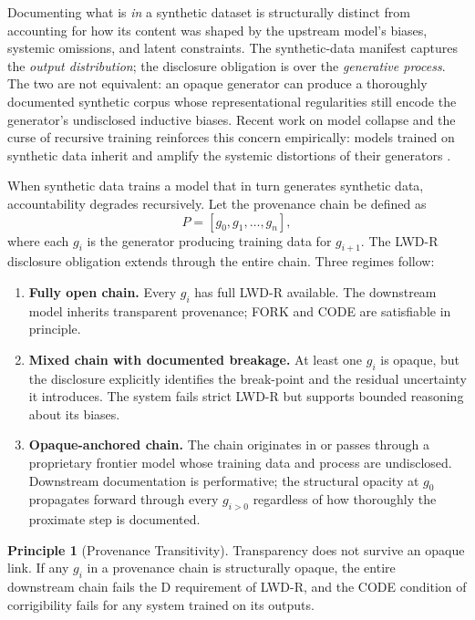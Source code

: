 \documentclass{article}
\theoremstyle{definition}
\newtheorem{principle}{Principle}[section]
\begin{document}
Documenting what is \emph{in} a synthetic dataset is structurally distinct from accounting for how its content was shaped by the upstream model's biases, systemic omissions, and latent constraints. The synthetic-data manifest captures the \emph{output distribution}; the disclosure obligation is over the \emph{generative process}. The two are not equivalent: an opaque generator can produce a thoroughly documented synthetic corpus whose representational regularities still encode the generator's undisclosed inductive biases. Recent work on model collapse and the curse of recursive training reinforces this concern empirically: models trained on synthetic data inherit and amplify the systemic distortions of their generators \citep{shumailov2023curse}.

When synthetic data trains a model that in turn generates synthetic data, accountability degrades recursively. Let the provenance chain be defined as
\[
P = [g_0, g_1, \ldots, g_n],
\]
where each $g_i$ is the generator producing training data for $g_{i+1}$. The LWD-R disclosure obligation extends through the entire chain. Three regimes follow:

\begin{enumerate}[noitemsep]
    \item \textbf{Fully open chain.} Every $g_i$ has full LWD-R available. The downstream model inherits transparent provenance; FORK and CODE are satisfiable in principle.
    \item \textbf{Mixed chain with documented breakage.} At least one $g_i$ is opaque, but the disclosure explicitly identifies the break-point and the residual uncertainty it introduces. The system fails strict LWD-R but supports bounded reasoning about its biases.
    \item \textbf{Opaque-anchored chain.} The chain originates in or passes through a proprietary frontier model whose training data and process are undisclosed. Downstream documentation is performative; the structural opacity at $g_0$ propagates forward through every $g_{i>0}$ regardless of how thoroughly the proximate step is documented.
\end{enumerate}

\begin{principle}[Provenance Transitivity]
\label{prin:provenance}
Transparency does not survive an opaque link. If any $g_i$ in a provenance chain is structurally opaque, the entire downstream chain fails the D requirement of LWD-R, and the CODE condition of corrigibility fails for any system trained on its outputs.
\end{principle}
\end{document}
